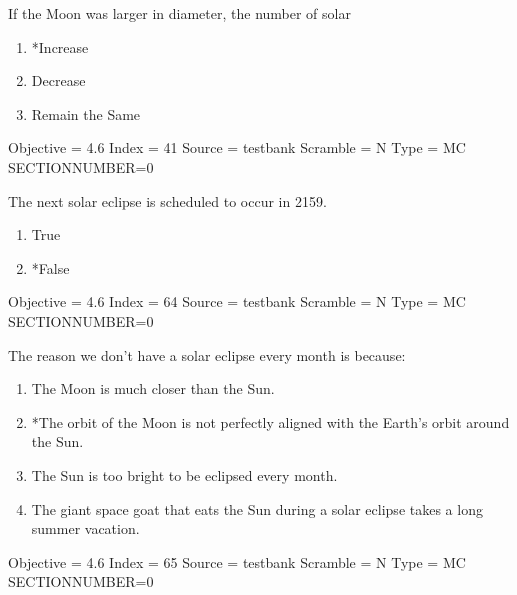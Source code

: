 \documentclass[11pt]{article}
\begin{document}
\begin{enumerate}
\begin{minipage}{\textwidth}
\begin{minipage}{\textwidth}
\item If the Moon was larger in diameter, the number of solar
\begin{multicols}{3}
\begin{enumerate} 
\setlength{\itemsep}{1pt} 
\setlength{\parskip}{0pt} 
\setlength{\parsep}{0pt}
\setlength{\multicolsep}{1pt} 
\item *Increase
\item Decrease
\item Remain the Same
\end{enumerate} 
\vfill 
\end{multicols}

Objective = 4.6
Index = 41
Source = testbank
Scramble = N
Type = MC
SECTIONNUMBER=0
\end{minipage}
\end{minipage}
\vskip 0.20in

\begin{minipage}{\textwidth}
\begin{minipage}{\textwidth}
\item The next solar eclipse is scheduled to occur in 2159.
\begin{multicols}{3}
\begin{enumerate} 
\setlength{\itemsep}{1pt} 
\setlength{\parskip}{0pt} 
\setlength{\parsep}{0pt}
\setlength{\multicolsep}{1pt} 
\item True
\item *False
\end{enumerate} 
\vfill 
\end{multicols}

Objective = 4.6
Index = 64
Source = testbank
Scramble = N
Type = MC
SECTIONNUMBER=0
\end{minipage}
\end{minipage}
\vskip 0.20in

\begin{minipage}{\textwidth}
\begin{minipage}{\textwidth}
\item The reason we don't have a solar eclipse every month is because:
\begin{enumerate} 
\setlength{\itemsep}{1pt} 
\setlength{\parskip}{0pt} 
\setlength{\parsep}{0pt}
\setlength{\multicolsep}{1pt} 
\item The Moon is much closer than the Sun.
\item *The orbit of the Moon is not perfectly aligned with the Earth's orbit around the Sun.
\item The Sun is too bright to be eclipsed every month.
\item The giant space goat that eats the Sun during a solar eclipse takes a long summer vacation.
\end{enumerate} 
Objective = 4.6
Index = 65
Source = testbank
Scramble = N
Type = MC
SECTIONNUMBER=0
\end{minipage}
\end{minipage}
\vskip 0.20in


\end{enumerate}
\end{document}
